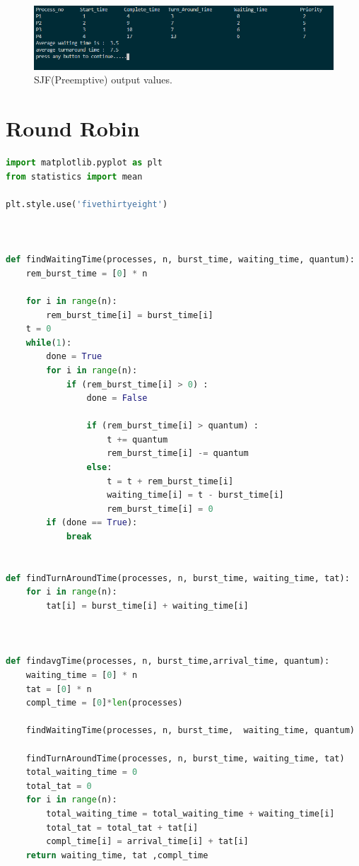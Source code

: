 \documentclass[11pt,a4paper]{report}
\begin{document}
{\begin{figure}[H]
	\centering
	\includegraphics[scale=0.75]{./img/priority_np_out.PNG}
	\caption{SJF(Preemptive) output values.}
\end{figure}}

\chapter{Round Robin}
\begin{lstlisting}[language=Python,caption = Round Robin Source Code,breaklines=true,postbreak=\mbox{\textcolor{red}{$\hookrightarrow$}\space},]
import matplotlib.pyplot as plt
from statistics import mean

plt.style.use('fivethirtyeight')



def findWaitingTime(processes, n, burst_time, waiting_time, quantum):  
    rem_burst_time = [0] * n 

    for i in range(n):  
        rem_burst_time[i] = burst_time[i] 
    t = 0
    while(1): 
        done = True
        for i in range(n): 
            if (rem_burst_time[i] > 0) : 
                done = False 
                  
                if (rem_burst_time[i] > quantum) : 
                    t += quantum  
                    rem_burst_time[i] -= quantum  
                else: 
                    t = t + rem_burst_time[i]  
                    waiting_time[i] = t - burst_time[i]  
                    rem_burst_time[i] = 0
        if (done == True): 
            break
              

def findTurnAroundTime(processes, n, burst_time, waiting_time, tat): 
    for i in range(n): 
        tat[i] = burst_time[i] + waiting_time[i]  
  
  

def findavgTime(processes, n, burst_time,arrival_time, quantum):  
    waiting_time = [0] * n 
    tat = [0] * n  
    compl_time = [0]*len(processes)

    findWaitingTime(processes, n, burst_time,  waiting_time, quantum)  

    findTurnAroundTime(processes, n, burst_time, waiting_time, tat)    
    total_waiting_time = 0
    total_tat = 0
    for i in range(n): 
        total_waiting_time = total_waiting_time + waiting_time[i]  
        total_tat = total_tat + tat[i]  
        compl_time[i] = arrival_time[i] + tat[i]
    return waiting_time, tat ,compl_time
      



\end{lstlisting}
\end{document}
